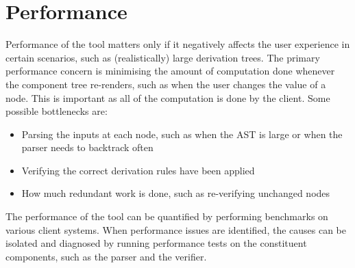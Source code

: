 \section{Performance}
Performance of the tool matters only if it negatively affects the user experience in certain scenarios, such as (realistically) large derivation trees. The primary performance concern is minimising the amount of computation done whenever the component tree re-renders, such as when the user changes the value of a node. This is important as all of the computation is done by the client. Some possible bottlenecks are:
\begin{itemize}
    \item Parsing the inputs at each node, such as when the AST is large or when the parser needs to backtrack often
    \item Verifying the correct derivation rules have been applied
    \item How much redundant work is done, such as re-verifying unchanged nodes
\end{itemize}
The performance of the tool can be quantified by performing benchmarks on various client systems. When performance issues are identified, the causes can be isolated and diagnosed by running performance tests on the constituent components, such as the parser and the verifier.